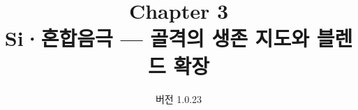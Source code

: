 


\renewcommand{\theequation}{3.\arabic{equation}}
\renewcommand{\thesection}{3.\arabic{section}}

\title{\textbf{\LARGE Chapter 3}\\[0.35em]\Large Si·혼합음극 --- 골격의 생존 지도와 블렌드 확장}
\author{}
\date{\normalsize 버전 1.0.23}


\maketitle










